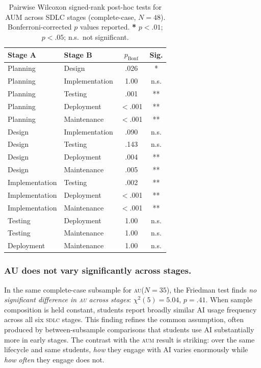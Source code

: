 \documentclass[sigconf,anonymous]{acmart}
\newcommand{\AUM}{\textsc{aum}\xspace}
\newcommand{\AU}{\textsc{au}\xspace}
\newcommand{\SDLC}{\textsc{sdlc}\xspace}
\begin{document}
\begin{table}[h]
\small
\caption{Pairwise Wilcoxon signed-rank post-hoc tests for AUM across
  SDLC stages (complete-case, $N = 48$). Bonferroni-corrected $p$
  values reported. {\bf **} $p<.01$; {\bf *} $p<.05$; n.s.~not
  significant.}
\label{tab:posthoc}
\begin{tabular}{llcc}
\toprule
\textbf{Stage A} & \textbf{Stage B} & $p_{\text{Bonf}}$ & \textbf{Sig.} \\
\midrule
Planning       & Design         & .026   & *    \\
Planning       & Implementation & 1.00   & n.s. \\
Planning       & Testing        & .001   & **   \\
Planning       & Deployment     & $<$.001 & ** \\
Planning       & Maintenance    & $<$.001 & ** \\
Design         & Implementation & .090   & n.s. \\
Design         & Testing        & .143   & n.s. \\
Design         & Deployment     & .004   & **   \\
Design         & Maintenance    & .005   & **   \\
Implementation & Testing        & .002   & **   \\
Implementation & Deployment     & $<$.001 & ** \\
Implementation & Maintenance    & $<$.001 & ** \\
Testing        & Deployment     & 1.00   & n.s. \\
Testing        & Maintenance    & 1.00   & n.s. \\
Deployment     & Maintenance    & 1.00   & n.s. \\
\bottomrule
\end{tabular}
\end{table}

\subsubsection{AU does not vary significantly across stages.}
In the same complete-case subsample for \AU ($N = 35$), the Friedman
test finds \emph{no significant difference in \AU across stages}:
$\chi^2(5) = 5.04$, $p = .41$. When sample composition is held
constant, students report broadly similar AI usage frequency across all
six \SDLC stages. This finding refines the common assumption, often
produced by between-subsample comparisons that students use AI
substantially more in early stages. The contrast with the \AUM result
is striking: over the same lifecycle and same students, \emph{how}
they engage with AI varies enormously while \emph{how often} they
engage does not.
\end{document}
